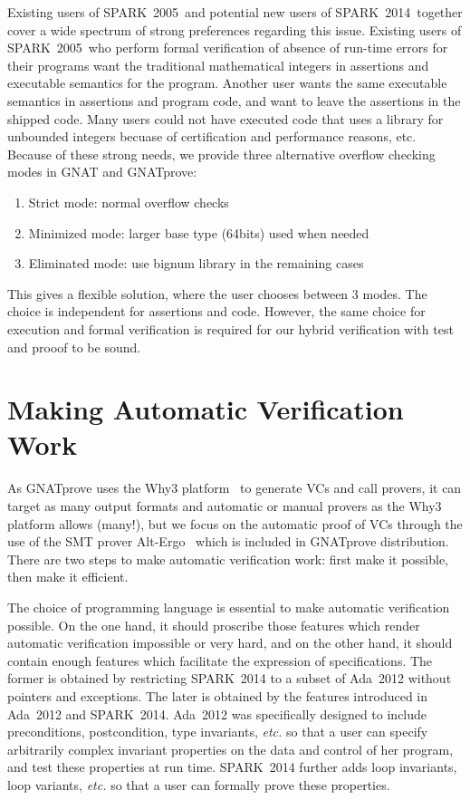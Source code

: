 \documentclass[sttt,draft]{svjour}
\newcommand{\gnatprove}{GNATprove\xspace}
\newcommand{\oldspark}{SPARK~2005\xspace}
\newcommand{\newspark}{SPARK~2014\xspace}
\newcommand{\adatwtw}{Ada~2012\xspace}
\newcommand{\etc}{\textit{etc.}\xspace}
\begin{document}
Existing users of \oldspark\ and potential new users of \newspark\
together cover a wide spectrum of strong preferences regarding this
issue. Existing users of \oldspark\ who perform formal verification of
absence of run-time errors for their programs want the traditional
mathematical integers in assertions and executable semantics for the
program. Another user wants the same executable semantics in
assertions and program code, and want to leave the assertions in the
shipped code. Many users could not have executed code that uses a
library for unbounded integers becuase of certification and
performance reasons, etc. Because of these strong needs, we provide
three alternative overflow checking modes in GNAT and \gnatprove:
\begin{enumerate}
\item Strict mode: normal overflow checks
\item Minimized mode: larger base type (64bits) used when needed
\item Eliminated mode: use bignum library in the remaining cases
\end{enumerate}
This gives a flexible solution, where the user chooses between 3
modes. The choice is independent for assertions and code. However, the
same choice for execution and formal verification is required for our
hybrid verification with test and prooof to be sound.
\section{Making Automatic Verification Work}
\label{automation}

As \gnatprove uses the Why3 platform~\cite{why3} to generate VCs and call
provers, it can target as many output formats and automatic or manual provers
as the Why3 platform allows (many!), but we focus on the automatic proof of VCs
through the use of the SMT prover Alt-Ergo~\cite{altergo} which is included in
\gnatprove distribution. There are two steps to make automatic verification
work: first make it possible, then make it efficient.

The choice of programming language is essential to make automatic verification
possible. On the one hand, it should proscribe those features which render
automatic verification impossible or very hard, and on the other hand, it
should contain enough features which facilitate the expression of
specifications. The former is obtained by restricting \newspark to a subset of
\adatwtw without pointers and exceptions. The later is obtained by the features
introduced in \adatwtw and \newspark. \adatwtw was specifically designed to
include preconditions, postcondition, type invariants, \etc so that a user can
specify arbitrarily complex invariant properties on the data and control of her
program, and test these properties at run time. \newspark further adds loop
invariants, loop variants, \etc so that a user can formally prove these
properties.
\end{document}
